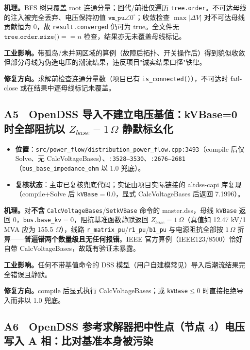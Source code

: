 \documentclass[11pt,a4paper,fontset=fandol]{ctexart}
\newcommand{\file}[1]{\texttt{#1}}
\begin{document}
\textbf{机理。}BFS 树只覆盖 root 连通分量；回代/前推仅遍历 \file{tree.order}。不可达母线的注入被完全丢弃、电压保持初值 $\texttt{vm\_pu}\angle 0^\circ$；收敛检查 $\max|\Delta V|$ 对不可达母线贡献恒为 0，故 \texttt{result.converged} 仍可为 true。全文件无 $\texttt{tree.order.size()}==n$ 检查，结果亦无未覆盖母线标记。

\textbf{工业影响。}带孤岛/未并网区域的算例（故障后拓扑、开关操作后）得到貌似收敛但部分母线为伪造电压的潮流结果，违反项目"诚实结果口径"铁律。

\textbf{修复方向。}求解前检查连通分量数（项目已有 \file{is\_connected()}），不可达时 fail-close 或在结果中逐母线标记未覆盖。

\subsection{A5　OpenDSS 导入不建立电压基值：kVBase=0 时全部阻抗以 $Z_{base}=1\,\Omega$ 静默标幺化}
\label{sec:a5}

\begin{itemize}
  \item \textbf{位置}：\file{src/power\_flow/distribution\_power\_flow.cpp:3493}（compile 后仅 Solve、无 CalcVoltageBases）、\file{:3528--3530}、\file{:2676--2681}（\file{bus\_base\_impedance\_ohm} 以 1.0 兜底）。
  \item \textbf{复核状态}：主审已复核兜底代码；实证由项目实际链接的 altdss-capi 库复现（compile+Solve 后 \file{kVBase}$=0.0$，显式 CalcVoltageBases 后返回 7.1996）。
\end{itemize}

\textbf{机理。}对\textbf{不含} \file{CalcVoltageBases}/\file{SetkVBase} 命令的 master.dss，母线 \file{kVBase} 返回 0，\file{bus.base\_kv}$=0$，阻抗基准函数静默返回 $Z_{base}=1\,\Omega$（真值如 12.47 kV/1 MVA 应为 155.5 $\Omega$），线路 \file{r\_matrix\_pu}/\file{r1\_pu}/\file{b1\_pu} 与电源阻抗全部按 $1\,\Omega$ 折算——\textbf{普遍错两个数量级且无任何报错}。IEEE 官方算例（IEEE123/8500）恰好自带 CalcVoltageBases，故既有验证未暴露。

\textbf{工业影响。}任何不带基值命令的 DSS 模型（用户自建模常见）导入后潮流结果完全错误且静默。

\textbf{修复方向。}compile 后显式执行 CalcVoltageBases；或 \file{kVBase}$\le 0$ 时直接拒绝导入而非以 1.0 兜底。

\subsection{A6　OpenDSS 参考求解器把中性点（节点 4）电压写入 A 相：比对基准本身被污染}
\label{sec:a6}
\end{document}
